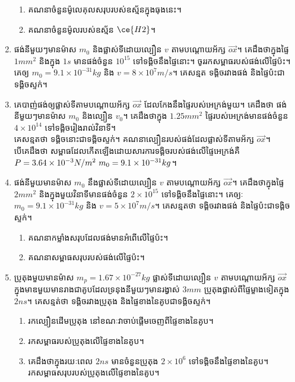 \begin{enumerate}[m]
	\begin{enumerate}[k]
		\item គណនាចំនួនម៉ូលេគុលសរុបរបស់ឧស្ម័នក្នុងធុងនេះ។
		\item គណនាចំនួនម៉ូលរបស់ឧស្ម័ន $\ce{H2}$។
	\end{enumerate}
	\item ផង់នីមួយៗមានម៉ាស $m_{0}$ និងផ្លាស់ទីដោយល្បឿន $v$ តាមបណ្តោយអ័ក្ស $\overrightarrow{ox}$។ គេដឹងថាក្នុងផ្ទៃ $1mm^{2}$ និងក្នុង $1s$ មានផង់ចំនួន $10^{15}$ ទៅទង្គិចនឹងផ្ទៃនោះ។
	ចូររកសម្ពាធរបស់ផង់លើផ្ទៃប៉ះ។\\
	គេឲ្យ $m_{0}=9.1\times10^{-31}kg$ និង $v=8\times10^{7}m/s$។ គេសន្មត ទង្គិចរវាងផង់ និងផ្ទៃប៉ះជាទង្គិចស្ទក់។
	\item គេបាញ់ផង់ឲ្យផ្លាស់ទីតាមបណ្តោយអ័ក្ស $\overrightarrow{ox}$ ដែលកែងនឹងផ្ទៃរបស់អេក្រង់មួយ។ គេដឹងថា ផង់នីមួយៗមានម៉ាស $m_{0}$ និងល្បឿន $v_{0}$។ គេដឹងថាក្នុង $1.25mm^{2}$ ផ្ទៃរបស់អេក្រង់មានផង់ចំនួន $4\times10^{14}$ ទៅទង្គិចរៀងរាល់វិនាទី។ \\គេសន្មតថា ទង្គិចនោះជាទង្គិចស្ទក់។ គណនាល្បឿនរបស់ផង់ដែលផ្លាស់ទីតាមអ័ក្ស $\overrightarrow{ox}$។\\ បើគេដឹងថា សម្ពាធដែលកើតឡើងដោយសារការទង្គិចរបស់ផង់លើផ្ទៃអេក្រង់គឺ $P=3.64\times10^{-3}N/m^{2}\\~m_{0}=9.1\times10^{-31}kg$។
	\item ផង់នីមួយមានម៉ាស $m_{0}$ នឹងផ្លាស់ទីដោយល្បឿន $v$ តាមបណ្តោយអ័ក្ស $\overrightarrow{ox}$។ គេដឹងថាក្នុងផ្ទៃ $2mm^{2}$ និងក្នុងមួយវិនាទីមានផង់ចំនួន $2\times10^{15}$ ទៅទង្គិចនឹងផ្ទៃនោះ។ គេឲ្យៈ $m_{0}=9.1\times10^{-31}kg$ និង $v=5\times10^{7}m/s$។ គេសន្មតថា ទង្គិចរវាងផង់ និងផ្ទៃប៉ះជាទង្គិចស្ទក់។
	\begin{enumerate}[k,2]
		\item គណនាកម្លាំងសរុបដែលផង់មានអំពើលើផ្ទៃប៉ះ។
		\item គណនាសម្ពាធសរុបរបស់ផង់លើផ្ទៃប៉ះ។
	\end{enumerate}
	\item ប្រូតុងមួយមានម៉ាស $m_{p}=1.67\times10^{-27}kg$ ផ្លាស់ទីដោយល្បឿន $v$ តាមបណ្តោយអ័ក្ស $\overrightarrow{ox}$ ក្នុងមាឌមួយមានរាងជាគូបដែលទ្រនុងនីមួយៗមានរង្វាស់ $3mm$ ប្រូតុងផ្លាស់ពីផ្ទៃម្ខាងទៀតក្នុង $2ns$។ គេសន្មត់ថា ទង្គិចរវាងប្រូតុង និងផ្ទៃខាងនៃគូបជាទង្គិចស្ទក់។
	\begin{enumerate}[k]
		\item រកល្បឿនដើមប្រូតុង នៅខណៈវាចាប់ផ្តើមចេញពីផ្ទៃខាងនៃគូប។
		\item រកសម្ពាធរបស់ប្រូតុងលើផ្ទៃខាងនៃគូប។
		\item គេដឹងថាក្នុងរយៈពេល $2ns$ មានចំនួនប្រូតុង $2\times10^{6}$ ទៅទង្គិចនឹងផ្ទៃខាងនៃគូប។ រកសម្ពាធសរុបរបស់ប្រូតុងលើផ្ទៃខាងនៃគូប។

\end{enumerate}
\end{enumerate}
